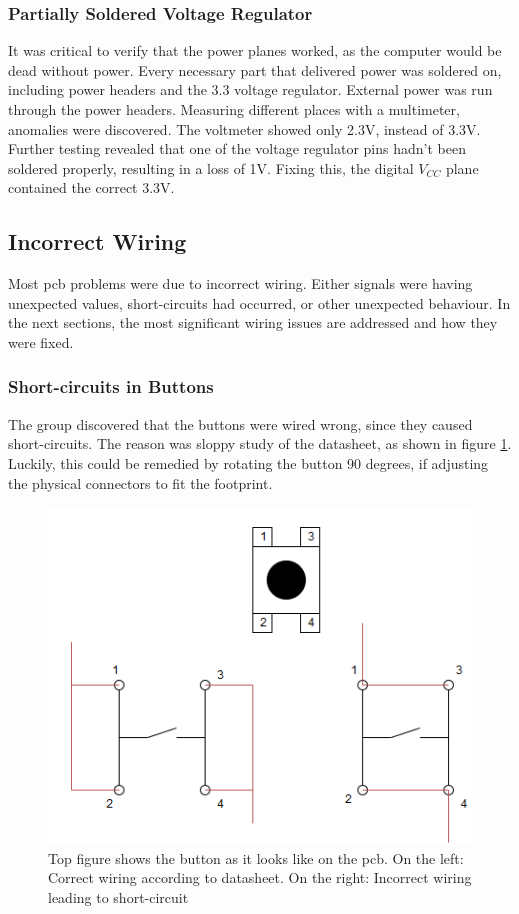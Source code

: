 \subsubsection{Partially Soldered Voltage Regulator}
It was critical to verify that the power planes worked, as the computer would be dead without power.
Every necessary part that delivered power was soldered on, including power headers and the 3.3 voltage regulator.
External power was run through the power headers.
Measuring different places with a multimeter, anomalies were discovered.
The voltmeter showed only 2.3V, instead of 3.3V.
Further testing revealed that one of the voltage regulator pins hadn't been soldered properly, resulting in a loss of 1V.
Fixing this, the digital \(V_{CC}\) plane contained the correct 3.3V.

\subsection{Incorrect Wiring}
Most \gls{pcb} problems were due to incorrect wiring.
Either signals were having unexpected values, short-circuits had occurred, or other unexpected behaviour.
In the next sections, the most significant wiring issues are addressed and how they were fixed.

\subsubsection{Short-circuits in Buttons}
The group discovered that the buttons were wired wrong, since they caused short-circuits.
The reason was sloppy study of the datasheet, as shown in figure \ref{fig:Button Issue}.
Luckily, this could be remedied by rotating the button 90 degrees, if adjusting the physical connectors to fit the footprint.

\begin{figure}[h!]
\centering
\includegraphics[scale=0.5]{images/Button_Issue.png}
\caption{Top figure shows the button as it looks like on the \gls{pcb}. On the left: Correct wiring according to datasheet. On the right: Incorrect wiring leading to short-circuit}
\label{fig:Button Issue}
\end{figure}

